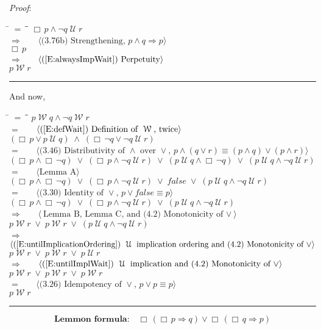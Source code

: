 \documentclass[12pt, fleqn, leqno]{article}
\newcommand{\lgap}{2pt}                             %
\newcommand{\mymathindent}{24pt}                    %
\newcommand{\impl}{\ensuremath{\Rightarrow}}        %
\newcommand{\Until}{\;\mathcal{U}\;}
\newcommand{\Wait}{\;\mathcal{W}\;}
\newcommand{\Always}{\Box\,}
\newcommand{\myqed}{\rule[-.23ex]{1.2ex}{2.0ex}}
\newcommand{\myqedtab}{\hspace{384pt}}              %
\newcommand{\Gll} {\langle}                         %
\newcommand{\Ggg} {\rangle}                         %
\newcommand{\Hint}[1]     {\ \ \ $\Gll              \mbox{#1} \Ggg$ }   %
\begin{document}
{\emph{Proof}:
\begin{tabbing}
\hspace{\mymathindent} \= $= \;$ \= \myqedtab \= \kill
  \> \>   $\Always p \land \neg q\Until r$\\[\lgap]
  \> $\impl$  \>  \Hint{(3.76b) Strengthening, $p\land q \impl p$}\\[\lgap]
  \> \>   $\Always p$\\[\lgap]
  \> $\impl$ \> \Hint{(\ref{E:alwaysImpWait}) Perpetuity} \\[\lgap]
  \> \>   $p\Wait r$ \quad \myqed
\end{tabbing}
And now,
\begin{tabbing}
\hspace{\mymathindent} \= $= \;$ \= \myqedtab \= \kill
  \> \>   $p \Wait q \land \neg q \Wait r$\\[\lgap]
  \> $=$ \> \Hint{(\ref{E:defWait}) Definition of $\Wait$, twice} \\[\lgap]
  \> \>   $(\Always p\lor p\Until q) \;\land\; (\Always \neg q \lor \neg q \Until r)$\\[\lgap]
  \> $=$  \>  \Hint{(3.46) Distributivity of $\land$ over $\lor$, $p\land (q\lor r)\equiv (p\land q)\lor (p\land r)$}\\[\lgap]
  \> \>   $(\Always p\land \Always \neg q) \;\lor\; (\Always p\land \neg q\Until r) \;\lor\; (p\Until q\land \Always \neg q) \;\lor\; (p\Until q\land \neg q\Until r)$\\[\lgap]
  \> $=$  \>  \Hint{Lemma A}\\[\lgap]
  \> \>   $(\Always p\land \Always \neg q) \;\lor\; (\Always p\land \neg q\Until r) \;\lor\; \mathit{false} \;\lor\; (p\Until q\land \neg q\Until r)$\\[\lgap]
  \> $=$ \> \Hint{(3.30) Identity of $\lor$, $p\lor \mathit{false}\equiv p$} \\[\lgap]
  \> \>   $(\Always p\land \Always \neg q) \;\lor\; (\Always p\land \neg q\Until r) \;\lor\; (p\Until q\land \neg q\Until r)$\\[\lgap]
  \> $\impl$  \>  \Hint{Lemma B, Lemma C, and (4.2) Monotonicity of $\lor$}\\[\lgap]
  \> \>   $p\Wait r \;\lor\; p\Wait r \;\lor\; (p\Until q\land \neg q\Until r)$\\[\lgap]
  \> $\impl$  \>  \Hint{(\ref{E:untilImplicationOrdering}) $\Until$ implication ordering and (4.2) Monotonicity of $\lor$}\\[\lgap]
  \> \>   $p\Wait r \;\lor\; p\Wait r \;\lor\; p\Until r$\\[\lgap]
  \> $\impl$  \>  \Hint{(\ref{E:untilImplWait}) $\Until$ implication and (4.2) Monotonicity of $\lor$}\\[\lgap]
  \> \>   $p\Wait r \;\lor\; p\Wait r \;\lor\; p\Wait r$\\[\lgap]
  \> $=$ \> \Hint{(3.26) Idempotency of $\lor$, $p \lor p \equiv p$} \\[\lgap]
  \> \>   $p\Wait r$ \quad \myqed
\end{tabbing}
}
\begin{equation}\label{E:lemmon}
\textbf{Lemmon formula:}\quad \Always(\Always p\impl q)\lor \Always(\Always q\impl p)
\end{equation}
\end{document}
